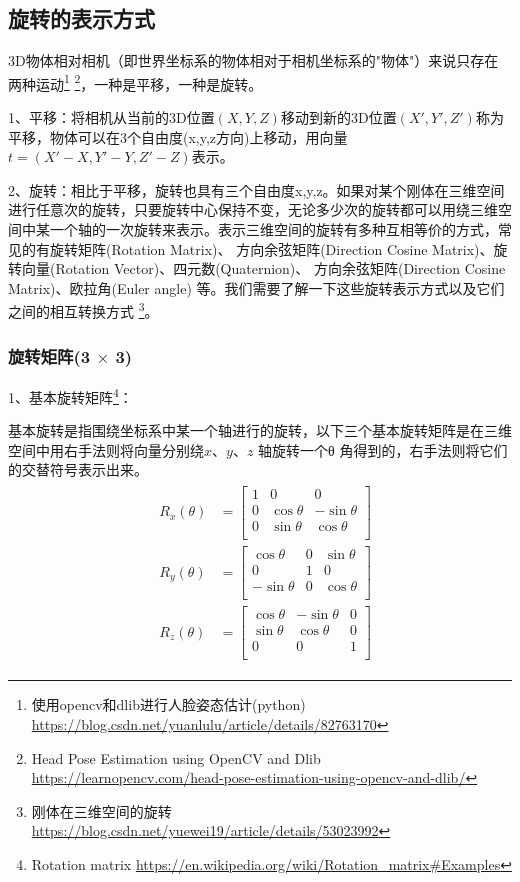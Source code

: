 \subsection{旋转的表示方式}

3D物体相对相机（即世界坐标系的物体相对于相机坐标系的"物体"）来说只存在两种运动\footnote{使用opencv和dlib进行人脸姿态估计(python) \quad \url{https://blog.csdn.net/yuanlulu/article/details/82763170}}
\footnote{Head Pose Estimation using OpenCV and Dlib \quad \url{https://learnopencv.com/head-pose-estimation-using-opencv-and-dlib/}}，一种是平移，一种是旋转。

1、平移：将相机从当前的3D位置$(X,Y,Z)$移动到新的3D位置$(X',Y',Z')$称为平移，物体可以在3个自由度(x,y,z方向)上移动，用向量$t = (X'-X,Y'-Y,Z'-Z)$表示。

2、旋转：相比于平移，旋转也具有三个自由度x,y,z。如果对某个刚体在三维空间进行任意次的旋转，只要旋转中心保持不变，无论多少次的旋转都可以用绕三维空间中某一个轴的一次旋转来表示。表示三维空间的旋转有多种互相等价的方式，常见的有旋转矩阵(Rotation Matrix)、 方向余弦矩阵(Direction Cosine Matrix)、旋转向量(Rotation Vector)、四元数(Quaternion)、 方向余弦矩阵(Direction Cosine Matrix)、欧拉角(Euler angle) 等。我们需要了解一下这些旋转表示方式以及它们之间的相互转换方式
\footnote{刚体在三维空间的旋转 \quad \url{https://blog.csdn.net/yuewei19/article/details/53023992}}。

\subsubsection{旋转矩阵(3 $\times$  3)}

1、基本旋转矩阵\footnote{Rotation matrix \quad \url{https://en.wikipedia.org/wiki/Rotation_matrix#Examples}}：

基本旋转是指围绕坐标系中某一个轴进行的旋转，以下三个基本旋转矩阵是在三维空间中用右手法则将向量分别绕$x$、$y$、$z$ 轴旋转一个θ 角得到的，右手法则将它们的交替符号表示出来。
\begin{align}
&{\displaystyle {\begin{alignedat}{1}R_{x}(\theta )&={\begin{bmatrix}1&0&0\\0&\cos \theta &-\sin \theta \\[3pt]0&\sin \theta &\cos \theta \\[3pt]\end{bmatrix}}\\[6pt]R_{y}(\theta )&={\begin{bmatrix}\cos \theta &0&\sin \theta \\[3pt]0&1&0\\[3pt]-\sin \theta &0&\cos \theta \\\end{bmatrix}}\\[6pt]R_{z}(\theta )&={\begin{bmatrix}\cos \theta &-\sin \theta &0\\[3pt]\sin \theta &\cos \theta &0\\[3pt]0&0&1\\\end{bmatrix}}\end{alignedat}}}
\end{align}

